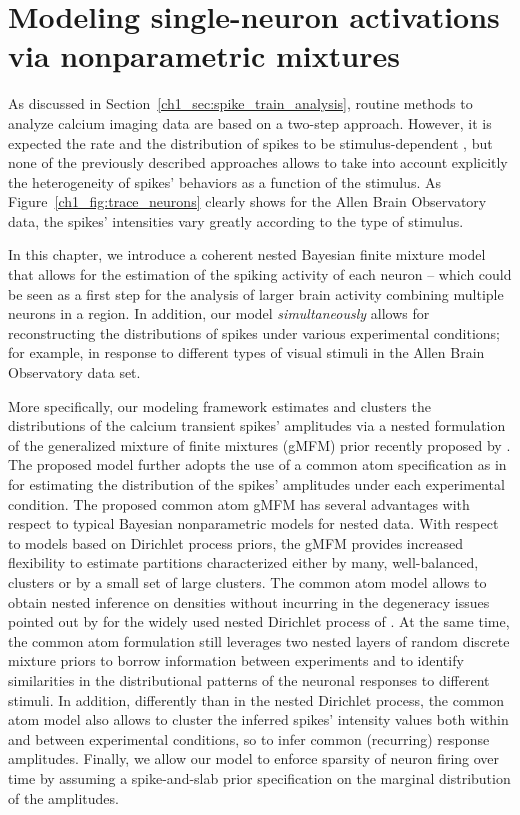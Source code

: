 \chapter{Modeling single-neuron activations via nonparametric mixtures}

\vspace{.7cm}
As discussed in Section~\ref{ch1_sec:spike_train_analysis}, routine methods to analyze calcium imaging data are based on a two-step approach. 
However, it is expected the rate and the distribution of spikes to be stimulus-dependent \citep{Brenner2002PhysRevE}, but none of the previously described approaches allows to take into account explicitly the heterogeneity of spikes' behaviors as a function of the stimulus. 
As Figure~\ref{ch1_fig:trace_neurons} clearly shows for the Allen Brain Observatory data, the spikes' intensities vary greatly according to the type of stimulus.

In this chapter, we introduce a coherent nested Bayesian finite mixture model that allows for the estimation of the spiking activity of each neuron -- which could be seen as a first step for the analysis of larger brain activity combining multiple neurons in a region. In addition, our model \textit{simultaneously} allows for reconstructing the distributions of spikes under various experimental conditions; for example, in response to different types of visual stimuli in the Allen Brain Observatory data set. 

More specifically, our modeling framework estimates and clusters the distributions of the calcium transient spikes' amplitudes via a nested formulation of the generalized mixture of finite mixtures (gMFM) prior recently proposed by \citet{fruhwirthschnatter2020}. 
The proposed model further adopts the use of a common atom specification as in \citet{denti2021} for estimating the distribution of the spikes' amplitudes under each experimental condition. The proposed common atom gMFM has several advantages with respect to typical Bayesian nonparametric models for nested data. With respect to models based on Dirichlet process priors, the gMFM provides increased flexibility to estimate partitions characterized either by many, well-balanced, clusters or by a small set of large clusters. The common atom model allows to obtain nested inference on densities without incurring in the degeneracy issues pointed out by \citet{camerlenghi2019} for the widely used nested Dirichlet process of \citet{rodriguez2008}. At the same time, the common atom formulation still leverages two nested layers of random discrete mixture priors to borrow information between experiments and to identify similarities in the distributional patterns of the neuronal responses to different stimuli. In addition, differently than in the nested Dirichlet process, the common atom model also allows to cluster the inferred spikes' intensity values both within and between experimental conditions, so to infer common (recurring) response amplitudes. Finally, we allow our model to enforce sparsity of neuron firing over time by assuming a spike-and-slab prior specification on the marginal distribution of the amplitudes.


